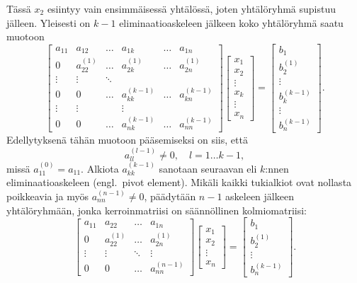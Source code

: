 Tässä $x_2$ esiintyy vain ensimmäisessä yhtälössä, joten yhtälöryhmä supistuu jälleen. 
Yleisesti on $k-1$ eliminaatioaskeleen jälkeen koko yhtälöryhmä saatu muotoon
\[
\left[\begin{array}{llllll}
a_{11}  &  a_{12} & \ldots & a_{1k} & \ldots & a_{1n} \\
0       &  a_{22}^{(1)} & \ldots & a_{2k}^{(1)} & \ldots & a_{2n}^{(1)} \\
\vdots  & \vdots        & \ddots \\
0       & 0             & \ldots & a_{kk}^{(k-1)} & \ldots & a_{kn}^{(k-1)} \\
\vdots  & \vdots        &        & \vdots \\
0       & 0             & \ldots & a_{nk}^{(k-1)} & \ldots & a_{nn}^{(k-1)}
\end{array}\right]
\begin{bmatrix}
x_1 \\ x_2 \\ \vdots \\ x_k \\ \vdots \\ x_n
\end{bmatrix} =
\left[\begin{array}{l}
b_1 \\ b_2^{(1)} \\ \vdots \\ b_k^{(k-1)} \\ \vdots \\ b_n^{(k-1)}
\end{array}\right].
\]
Edellytyksenä tähän muotoon pääsemiseksi on siis, että
\[
a_{ll}^{(l-1)} \neq 0, \quad l=1 \ldots k-1,
\]
missä $a_{11}^{(0)}=a_{11}$. Alkiota $a_{kk}^{(k-1)}$ sanotaan seuraavan eli $k$:nnen 
eliminaatioaskeleen
%
 (engl.\ pivot element). Mikäli kaikki tukialkiot ovat
nollasta poikkeavia ja myös $a_{nn}^{(n-1)} \neq 0$, päädytään $n-1$ askeleen jälkeen
yhtälöryhmään, jonka kerroinmatriisi on säännöllinen kolmiomatriisi:
\[
\left[\begin{array}{llllll}
a_{11} & a_{22} & \ldots & a_{1n} \\
0      & a_{22}^{(1)} & \ldots & a_{2n}^{(1)} \\
\vdots & \vdots & \ddots & \vdots \\
0 & 0 & \ldots  & a_{nn}^{(n-1)}
\end{array}\right]
 \begin{bmatrix}
x_1 \\ x_2 \\ \vdots \\ x_n
\end{bmatrix} =
\left[\begin{array}{l}
b_1 \\ b_2^{(1)} \\ \vdots \\ b_n^{(k-1)}
\end{array}\right].
\]
